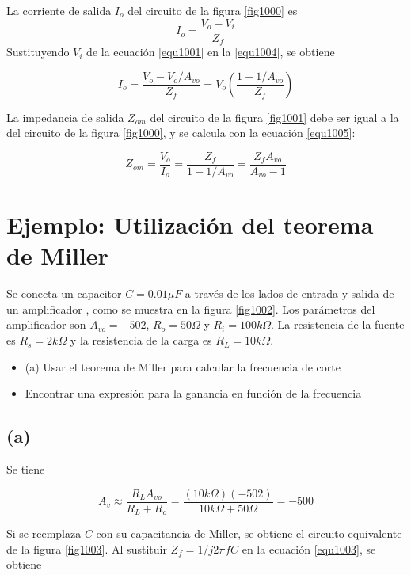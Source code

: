\documentclass[12pt]{book}
\theoremstyle{definition}
\theoremstyle{remark}
\theoremstyle{plain}
\begin{document}
La corriente de salida $I_{o}$ del circuito de la figura \ref{fig1000} es
\begin{equation}
\label{equ1004}
I_{o}=\frac{V_{o}-V_{i}}{Z_{f}}
\end{equation}
Sustituyendo $V_{i}$ de la ecuación \ref{equ1001} en la \ref{equ1004}, se obtiene

\begin{equation}
\label{equ1005}
I_{o}=\frac{V_{o}-V_{o}/A_{vo}}{Z_{f}}=V_{o}(\frac{1-1/A_{vo}}{Z_{f}})
\end{equation}

La impedancia de salida $Z_{om}$ del circuito de la figura \ref{fig1001} debe ser igual a la del circuito de la figura \ref{fig1000}, y se calcula con la ecuación \ref{equ1005}:

\begin{equation}
\label{equ1006}
Z_{om}=\frac{V_{o}}{I_{o}}=\frac{Z_{f}}{1-1/A_{vo}}=\frac{Z_{f}A_{vo}}{A_{vo}-1}
\end{equation}

\section{Ejemplo: Utilización del teorema de Miller}

Se conecta un capacitor $C=0.01 \mu F$ a través de los lados de entrada y salida de un amplificador , como se muestra en la  figura \ref{fig1002}. Los parámetros del amplificador son $A_{vo}=-502$, $R_{o} =50 \Omega$ y $R_{i}=100 k \Omega$. La resistencia de la fuente es $R_{s}=2 k\Omega$ y la resistencia de la carga es $R_{L}=10 k\Omega$.

\begin{itemize}
\item (a) Usar el teorema de Miller para calcular la frecuencia de corte
\item Encontrar una expresión para la ganancia en función de la frecuencia 
\end{itemize}

\subsection{(a)}
Se tiene

\begin{equation}
A_{v}\approx \frac{R_{L}A_{vo}}{R_{L}+R_{o}}=\frac{(10k\Omega)(-502)}{10k\Omega+50\Omega}=-500
\label{equ1007}
\end{equation}

Si se reemplaza $C$ con su capacitancia de Miller, se obtiene el circuito equivalente de la figura \ref{fig1003}. Al sustituir $Z_{f}=1/j2\pi fC$ en la ecuación \ref{equ1003}, se obtiene
\end{document}
